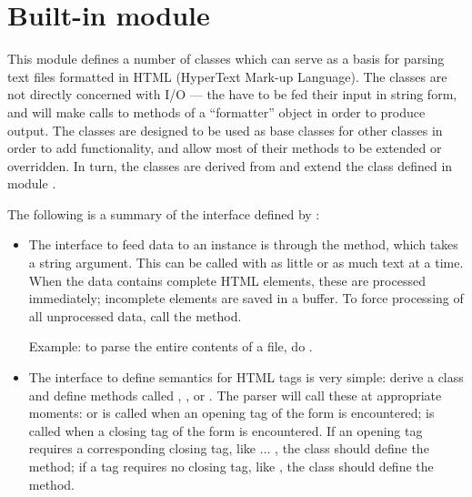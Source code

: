 \section{Built-in module }

\renewcommand{\indexsubitem}{(in module htmllib)}

This module defines a number of classes which can serve as a basis for
parsing text files formatted in HTML (HyperText Mark-up Language).
The classes are not directly concerned with I/O --- the have to be fed
their input in string form, and will make calls to methods of a
``formatter'' object in order to produce output.  The classes are
designed to be used as base classes for other classes in order to add
functionality, and allow most of their methods to be extended or
overridden.  In turn, the classes are derived from and extend the
class  defined in module .

The following is a summary of the interface defined by
:

\begin{itemize}

\item
The interface to feed data to an instance is through the 
method, which takes a string argument.  This can be called with as
little or as much text at a time.  When the data contains complete
HTML elements, these are processed immediately; incomplete elements
are saved in a buffer.  To force processing of all unprocessed data,
call the  method.

Example: to parse the entire contents of a file, do
.

\item
The interface to define semantics for HTML tags is very simple: derive
a class and define methods called ,
, or .  The parser will
call these at appropriate moments:  or
 is called when an opening tag of the form
 is encountered;  is called
when a closing tag of the form  is encountered.  If
an opening tag requires a corresponding closing tag, like 
... , the class should define the 
method; if a tag requires no closing tag, like , the class
should define the  method.

\end{itemize}

